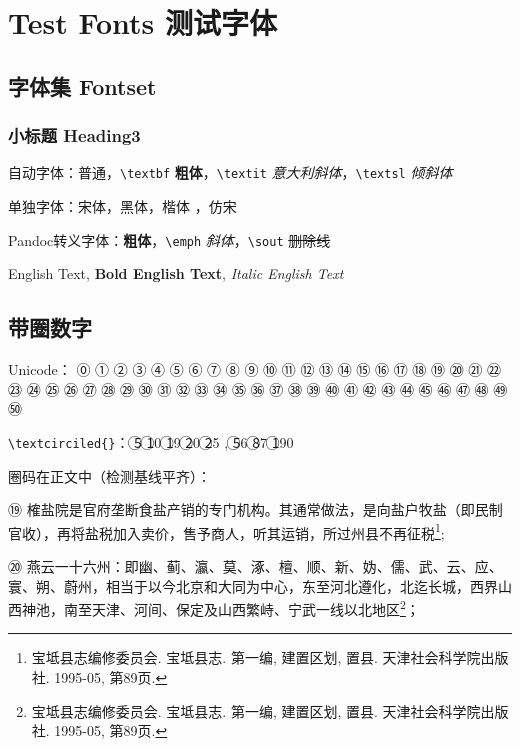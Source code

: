 
\section{Test Fonts 测试字体}

\subsection{字体集 Fontset}

\subsubsection{小标题 Heading3}

自动字体：普通，\verb|\textbf| \textbf{粗体}，\verb|\textit| \textit{意大利斜体}，\verb|\textsl| \textsl{倾斜体}

单独字体：{\songti 宋体}，{\heiti 黑体}，{\kaiti 楷体}
，{\fangsong 仿宋}%

Pandoc转义字体：\textbf{粗体}，\verb|\emph| \emph{斜体}，\verb|\sout| \sout{删除线}

English Text, \textbf{Bold English Text}, \textit{Italic English Text}

\subsection{带圈数字}

Unicode：
⓪ ① ② ③ ④ ⑤ ⑥ ⑦ ⑧ ⑨ ⑩ ⑪	⑫ ⑬	⑭ ⑮	⑯ ⑰ ⑱ ⑲	⑳ ㉑ ㉒	㉓ ㉔ ㉕ ㉖ ㉗ ㉘ ㉙ ㉚ ㉛ ㉜ ㉝ ㉞	㉟ ㊱ ㊲ ㊳ ㊴ ㊵ ㊶ ㊷ ㊸ ㊹ ㊺	㊻ ㊼ ㊽ ㊾ ㊿ 

\verb|\textcirciled{}|：
\textcircled{5} \textcircled{10} \textcircled{19} \textcircled{20} \textcircled{25} , \textcircled{56} \textcircled{87}  \textcircled{190}

圈码在正文中（检测基线平齐）：

⑲ 榷盐院是官府垄断食盐产销的专门机构。其通常做法，是向盐户牧盐（即民制官收），再将盐税加入卖价，售予商人，听其运销，所过州县不再征税\footnote{宝坻县志编修委员会. 宝坻县志. 第一编, 建置区划, 置县. 天津社会科学院出版社. 1995-05, 第89页.};

⑳ 燕云一十六州：即幽、蓟、瀛、莫、涿、檀、顺、新、妫、儒、武、云、应、寰、朔、蔚州，相当于以今北京和大同为中心，东至河北遵化，北迄长城，西界山西神池，南至天津、河间、保定及山西繁峙、宁武一线以北地区\footnote{宝坻县志编修委员会. 宝坻县志. 第一编, 建置区划, 置县. 天津社会科学院出版社. 1995-05, 第89页.}；

